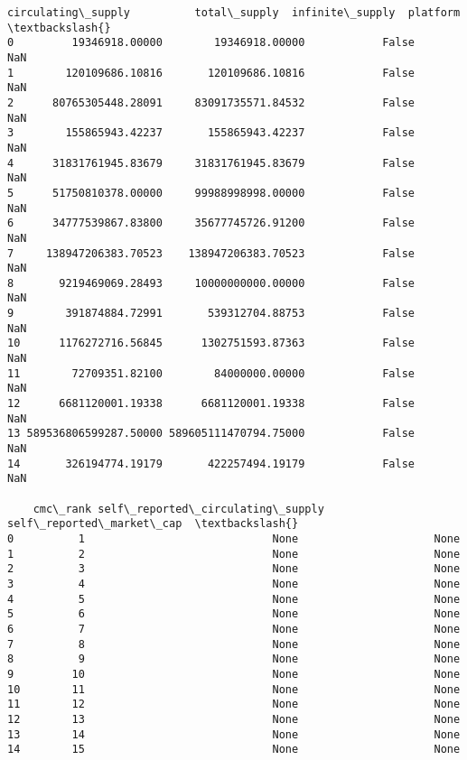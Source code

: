 \documentclass[11pt]{article}
\begin{document}
\begin{tcolorbox}[breakable, size=fbox, boxrule=.5pt, pad at break*=1mm, opacityfill=0]
\begin{Verbatim}[commandchars=\\\{\}]
      circulating\_supply          total\_supply  infinite\_supply  platform  \textbackslash{}
0         19346918.00000        19346918.00000            False       NaN
1        120109686.10816       120109686.10816            False       NaN
2      80765305448.28091     83091735571.84532            False       NaN
3        155865943.42237       155865943.42237            False       NaN
4      31831761945.83679     31831761945.83679            False       NaN
5      51750810378.00000     99988998998.00000            False       NaN
6      34777539867.83800     35677745726.91200            False       NaN
7     138947206383.70523    138947206383.70523            False       NaN
8       9219469069.28493     10000000000.00000            False       NaN
9        391874884.72991       539312704.88753            False       NaN
10      1176272716.56845      1302751593.87363            False       NaN
11        72709351.82100        84000000.00000            False       NaN
12      6681120001.19338      6681120001.19338            False       NaN
13 589536806599287.50000 589605111470794.75000            False       NaN
14       326194774.19179       422257494.19179            False       NaN

    cmc\_rank self\_reported\_circulating\_supply self\_reported\_market\_cap  \textbackslash{}
0          1                             None                     None
1          2                             None                     None
2          3                             None                     None
3          4                             None                     None
4          5                             None                     None
5          6                             None                     None
6          7                             None                     None
7          8                             None                     None
8          9                             None                     None
9         10                             None                     None
10        11                             None                     None
11        12                             None                     None
12        13                             None                     None
13        14                             None                     None
14        15                             None                     None


\end{Verbatim}
\end{tcolorbox}
\end{document}
